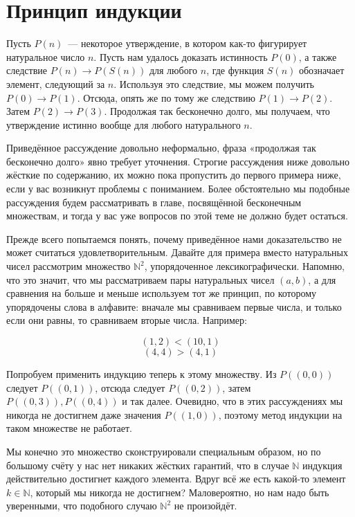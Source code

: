\section{Принцип индукции}

Пусть $P(n)$~— некоторое утверждение, в котором как-то фигурирует натуральное число $n$. Пусть нам удалось доказать истинность $P(0)$, а также следствие $P(n)\to P(S(n))$ для любого $n$, где функция $S(n)$ обозначает элемент, следующий за $n$. Используя это следствие, мы можем получить $P(0)\to P(1)$. Отсюда, опять же по тому же следствию $P(1)\to P(2)$. Затем $P(2)\to P(3)$. Продолжая так бесконечно долго, мы получаем, что утверждение истинно вообще для любого натурального $n$.

Приведённое рассуждение довольно неформально, фраза «продолжая так бесконечно долго» явно требует уточнения. Строгие рассуждения ниже довольно жёсткие по содержанию, их можно пока пропустить до первого примера ниже, если у вас возникнут проблемы с пониманием. Более обстоятельно мы подобные рассуждения будем рассматривать в главе, посвящённой бесконечным множествам, и тогда у вас уже вопросов по этой теме не должно будет остаться.

Прежде всего попытаемся понять, почему приведённое нами доказательство не может считаться удовлетворительным. Давайте для примера вместо натуральных чисел рассмотрим множество $\mathbb{N}^2$, упорядоченное лексикографически. Напомню, что это значит, что мы рассматриваем пары натуральных чисел $(a, b)$, а для сравнения на больше и меньше используем тот же принцип, по которому упорядочены слова в алфавите: вначале мы сравниваем первые числа, и только если они равны, то сравниваем вторые числа. Например:

$$(1, 2) < (10, 1)$$
$$(4, 4) > (4, 1)$$

Попробуем применить индукцию теперь к этому множеству. Из $P((0, 0))$ следует $P((0, 1))$, отсюда следует $P((0, 2))$, затем $P((0, 3)), P((0, 4))$ и так далее. Очевидно, что в этих рассуждениях мы никогда не достигнем даже значения $P((1, 0))$, поэтому метод индукции на таком множестве не работает.

Мы конечно это множество сконструировали специальным образом, но по большому счёту у нас нет никаких жёстких гарантий, что в случае $\mathbb{N}$ индукция действительно достигнет каждого элемента. Вдруг всё же есть какой-то элемент $k\in \mathbb{N}$, который мы никогда не достигнем? Маловероятно, но нам надо быть уверенными, что подобного случаю $\mathbb{N}^2$ не произойдёт.

